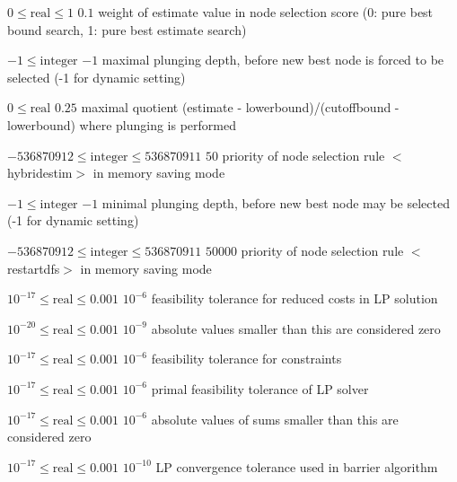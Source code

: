 %
{$0\leq\textrm{real}\leq1$}%
{$0.1$}%
{weight of estimate value in node selection score (0: pure best bound search, 1: pure best estimate search)}%
{}

%
{$-1\leq\textrm{integer}$}%
{$-1$}%
{maximal plunging depth, before new best node is forced to be selected (-1 for dynamic setting)}%
{}

%
{$0\leq\textrm{real}$}%
{$0.25$}%
{maximal quotient (estimate - lowerbound)/(cutoffbound - lowerbound) where plunging is performed}%
{}

%
{$-536870912\leq\textrm{integer}\leq536870911$}%
{$50$}%
{priority of node selection rule $<$hybridestim$>$ in memory saving mode}%
{}

%
{$-1\leq\textrm{integer}$}%
{$-1$}%
{minimal plunging depth, before new best node may be selected (-1 for dynamic setting)}%
{}

%
{$-536870912\leq\textrm{integer}\leq536870911$}%
{$50000$}%
{priority of node selection rule $<$restartdfs$>$ in memory saving mode}%
{}

%
{$10^{-17}\leq\textrm{real}\leq0.001$}%
{$10^{- 6}$}%
{feasibility tolerance for reduced costs in LP solution}%
{}

%
{$10^{-20}\leq\textrm{real}\leq0.001$}%
{$10^{- 9}$}%
{absolute values smaller than this are considered zero}%
{}

%
{$10^{-17}\leq\textrm{real}\leq0.001$}%
{$10^{- 6}$}%
{feasibility tolerance for constraints}%
{}

%
{$10^{-17}\leq\textrm{real}\leq0.001$}%
{$10^{- 6}$}%
{primal feasibility tolerance of LP solver}%
{}

%
{$10^{-17}\leq\textrm{real}\leq0.001$}%
{$10^{- 6}$}%
{absolute values of sums smaller than this are considered zero}%
{}

%
{$10^{-17}\leq\textrm{real}\leq0.001$}%
{$10^{-10}$}%
{LP convergence tolerance used in barrier algorithm}%
{}

